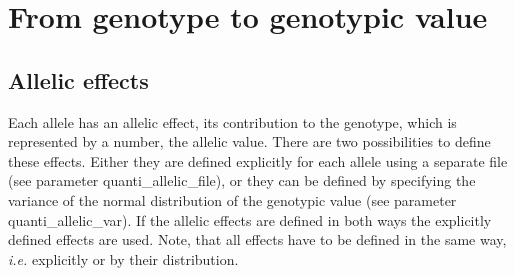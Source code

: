 \documentclass[letterpaper,12pt,oneside]{book}
\begin{document}
\section{From genotype to genotypic value }
\subsection{Allelic effects}
Each allele has an allelic effect, its contribution to the genotype, which is represented by a number, the allelic value. There are two possibilities to define these effects. Either they are defined explicitly for each allele using a separate file (see parameter \textsf{quanti\_allelic\_file}), or they can be defined by specifying the variance of the normal distribution of the genotypic value (see parameter \textsf{quanti\_allelic\_var}). If the allelic effects are defined in both ways the explicitly defined effects are used. Note, that all effects have to be defined in the same way, \textit{i.e.} explicitly or by their distribution.
\end{document}
